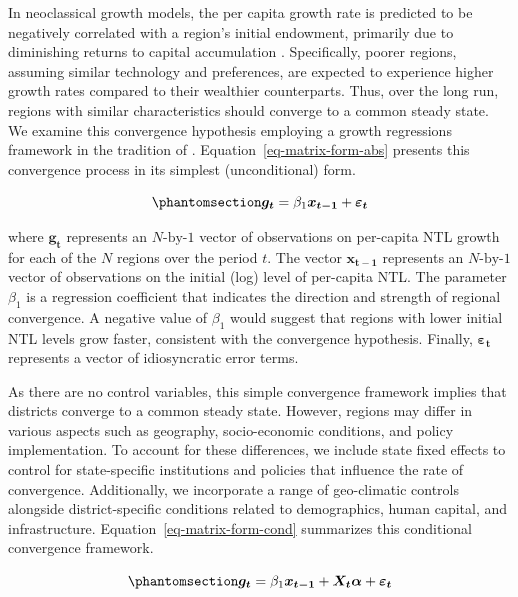 \documentclass[
  a4paper, 
  twoside,
  review
]{article}
\begin{document}
In neoclassical growth models, the per capita growth rate is predicted
to be negatively correlated with a region's initial endowment, primarily
due to diminishing returns to capital accumulation \citep{solow_growth}.
Specifically, poorer regions, assuming similar technology and
preferences, are expected to experience higher growth rates compared to
their wealthier counterparts. Thus, over the long run, regions with
similar characteristics should converge to a common steady state. We
examine this convergence hypothesis employing a growth regressions
framework in the tradition of \citet{barro_sala_convergence}.
Equation~\ref{eq-matrix-form-abs} presents this convergence process in
its simplest (unconditional) form.

\begin{equation}\phantomsection\label{eq-matrix-form-abs}{
\boldsymbol{g_t} =  \beta_1 \boldsymbol{x_{t-1}} +  \boldsymbol{\varepsilon_t}
}\end{equation}

where \(\boldsymbol{g_t}\) represents an \(N\text{-by-}1\) vector of
observations on per-capita NTL growth for each of the \(N\) regions over
the period \(t\). The vector \(\boldsymbol{x_{t-1}}\) represents an
\(N\text{-by-}1\) vector of observations on the initial (log) level of
per-capita NTL. The parameter \(\beta_1\) is a regression coefficient
that indicates the direction and strength of regional convergence. A
negative value of \(\beta_1\) would suggest that regions with lower
initial NTL levels grow faster, consistent with the convergence
hypothesis. Finally, \(\boldsymbol{\varepsilon_t}\) represents a vector
of idiosyncratic error terms.

As there are no control variables, this simple convergence framework
implies that districts converge to a common steady state. However,
regions may differ in various aspects such as geography, socio-economic
conditions, and policy implementation. To account for these differences,
we include state fixed effects to control for state-specific
institutions and policies that influence the rate of convergence.
Additionally, we incorporate a range of geo-climatic controls alongside
district-specific conditions related to demographics, human capital, and
infrastructure. Equation~\ref{eq-matrix-form-cond} summarizes this
conditional convergence framework.

\begin{equation}\phantomsection\label{eq-matrix-form-cond}{
\boldsymbol{g_t} =  \beta_1 \boldsymbol{x_{t-1}} + \boldsymbol{X_t} \boldsymbol{\alpha}  + \boldsymbol{\varepsilon_t}
}\end{equation}
\end{document}
